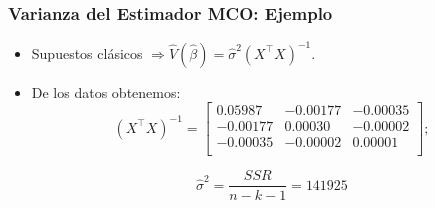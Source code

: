 \documentclass{beamer}
\begin{document}
\begin{frame}
\frametitle{Varianza del Estimador MCO: Ejemplo}


\begin{itemize}
    \item Supuestos clásicos $\Rightarrow \hat{V}(\hat{\beta}) = \hat{\sigma}^2(X^{\top}X)^{-1}$.
    \item De los datos obtenemos:
    \[
    (X^{\top}X)^{-1} =
    \begin{bmatrix}
    0.05987 & -0.00177 & -0.00035 \\
    -0.00177 & 0.00030 & -0.00002 \\
    -0.00035 & -0.00002 & 0.00001 \\
    \end{bmatrix}; \]
    
\[\hat{\sigma}^2 = \frac{SSR}{n-k-1} =141925
    \]
    
    
\end{itemize}
\end{frame}
\end{document}

